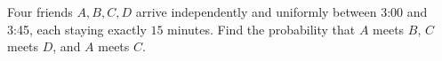Four friends $A,B,C,D$ arrive independently and uniformly between 3:00 and 3:45, each staying exactly $15$ minutes. Find the probability that $A$ meets $B$, $C$ meets $D$, and $A$ meets $C$.
